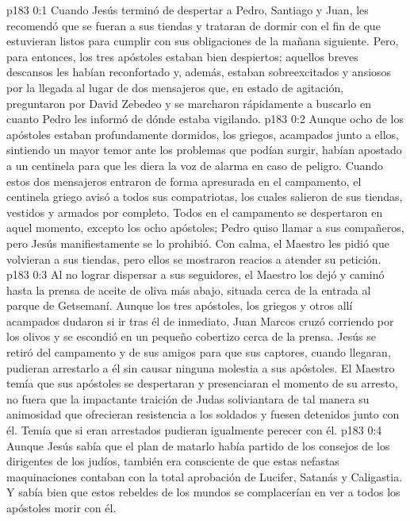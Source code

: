 \author{Comisión de seres intermedios}
\vs p183 0:1 Cuando Jesús terminó de despertar a Pedro, Santiago y Juan, les recomendó que se fueran a sus tiendas y trataran de dormir con el fin de que estuvieran listos para cumplir con sus obligaciones de la mañana siguiente. Pero, para entonces, los tres apóstoles estaban bien despiertos; aquellos breves descansos les habían reconfortado y, además, estaban sobreexcitados y ansiosos por la llegada al lugar de dos mensajeros que, en estado de agitación, preguntaron por David Zebedeo y se marcharon rápidamente a buscarlo en cuanto Pedro les informó de dónde estaba vigilando.
\vs p183 0:2 Aunque ocho de los apóstoles estaban profundamente dormidos, los griegos, acampados junto a ellos, sintiendo un mayor temor ante los problemas que podían surgir, habían apostado a un centinela para que les diera la voz de alarma en caso de peligro. Cuando estos dos mensajeros entraron de forma apresurada en el campamento, el centinela griego avisó a todos sus compatriotas, los cuales salieron de sus tiendas, vestidos y armados por completo. Todos en el campamento se despertaron en aquel momento, excepto los ocho apóstoles; Pedro quiso llamar a sus compañeros, pero Jesús manifiestamente se lo prohibió. Con calma, el Maestro les pidió que volvieran a sus tiendas, pero ellos se mostraron reacios a atender su petición.
\vs p183 0:3 Al no lograr dispersar a sus seguidores, el Maestro los dejó y caminó hasta la prensa de aceite de oliva más abajo, situada cerca de la entrada al parque de Getsemaní. Aunque los tres apóstoles, los griegos y otros allí acampados dudaron si ir tras él de inmediato, Juan Marcos cruzó corriendo por los olivos y se escondió en un pequeño cobertizo cerca de la prensa. Jesús se retiró del campamento y de sus amigos para que sus captores, cuando llegaran, pudieran arrestarlo a él sin causar ninguna molestia a sus apóstoles. El Maestro temía que sus apóstoles se despertaran y presenciaran el momento de su arresto, no fuera que la impactante traición de Judas soliviantara de tal manera su animosidad que ofrecieran resistencia a los soldados y fuesen detenidos junto con él. Temía que si eran arrestados pudieran igualmente perecer con él.
\vs p183 0:4 Aunque Jesús sabía que el plan de matarlo había partido de los consejos de los dirigentes de los judíos, también era consciente de que estas nefastas maquinaciones contaban con la total aprobación de Lucifer, Satanás y Caligastia. Y sabía bien que estos rebeldes de los mundos se complacerían en ver a todos los apóstoles morir con él.
